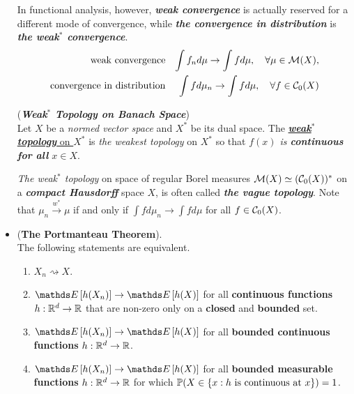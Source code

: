 \documentclass[11pt]{article}
\begin{document}
\begin{itemize}
\begin{remark}
In functional analysis, however, \emph{\textbf{weak convergence}} is actually reserved for a different mode of convergence, while \emph{\textbf{the convergence in distribution}} is \emph{\textbf{the weak$^*$ convergence}}.
\begin{align*}
 \text{weak convergence} && \int f_n d\mu \rightarrow \int f d\mu, \quad \forall \mu \in {\mathcal M}(X), \\
\text{convergence in distribution}  &&  \int f d\mu_n \rightarrow \int f d\mu, \quad \forall f \in {\mathcal C}_{0}(X)
\end{align*}

 \begin{definition}  (\textbf{\emph{Weak$^{*}$ Topology on Banach Space}})\\
Let $X$ be a \emph{normed vector space} and $X^{*}$ be its dual space. The \underline{\emph{\textbf{weak$^{*}$ topology}} on $X^{*}$} is \emph{the weakest topology} on $X^{*}$ so that \emph{$f(x)$ is \textbf{continuous} \textbf{for all} $x \in X$}.
\end{definition}

\emph{The weak$^{*}$ topology} on space of regular Borel measures ${\mathcal M}(X) \simeq ({\mathcal C}_{0}(X))^{*}$ on a \emph{\textbf{compact Hausdorff}} space $X$, is often called \emph{\textbf{the vague topology}}. Note that $\mu_n \stackrel{w^{*}}{\rightarrow} \mu$ if and only if $\int f d\mu_n \rightarrow \int f d\mu$ for all $f \in {\mathcal C}_0(X)$. 
\end{remark}

\item \begin{theorem} (\textbf{The Portmanteau Theorem}).  \citep{van2000asymptotic}\\
 The following statements are equivalent.
 \begin{enumerate}
 \item $X_n \rightsquigarrow X$.
 \item $\E{}{h(X_n)} \rightarrow \E{}{h(X)}$ for all \textbf{continuous functions} $h: {\mathbb R}^d \rightarrow {\mathbb R}$ that are non-zero only on a \textbf{closed} and \textbf{bounded} set.
 \item $\E{}{h(X_n)} \rightarrow \E{}{h(X)}$ for all \textbf{bounded continuous functions} $h: {\mathbb R}^d \rightarrow {\mathbb R}$.
 \item $\E{}{h(X_n)} \rightarrow \E{}{h(X)}$ for all \textbf{bounded measurable functions} $h: {\mathbb R}^d \rightarrow {\mathbb R}$ for which ${\mathbb P}(X \in \{x: h\text{ is continuous at }x\})=1$.
 \end{enumerate}
\end{theorem}



\end{itemize}
\end{document}
